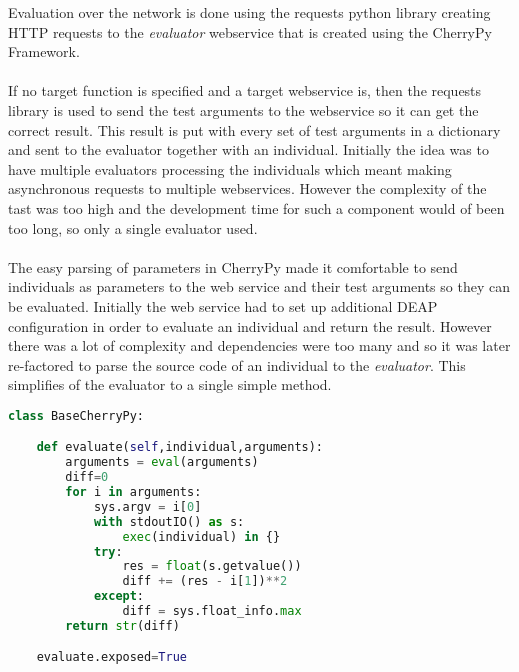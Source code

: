 Evaluation over the network is done using the requests python library creating HTTP requests to the \textit{evaluator} webservice that is created using the CherryPy Framework.
\paragraph{}
If no target function is specified and a target webservice is, then the requests library is used to send the test arguments to the webservice so it can get the correct result. This result
is put with every set of test arguments in a dictionary and sent to the evaluator together with an individual. Initially the idea was to have multiple evaluators processing the
individuals which meant making asynchronous requests to multiple webservices. However the complexity of the tast was too high and the development time for such a component would
of been too long, so only a single evaluator used.
\paragraph{}
The easy parsing of parameters in CherryPy made it comfortable to send individuals as parameters to the web service and their test arguments so they can be evaluated. Initially
the web service had to set up additional DEAP configuration in order to evaluate an individual and return the result. However there was a lot of complexity and dependencies were
too many and so it was later re-factored to parse the source code of an individual to the \textit{evaluator}. This simplifies of the evaluator to 
a single simple method.

\begin{lstlisting}[language=Python,caption={The soruce of the evaluator},label={lst:evaluator}]
class BaseCherryPy:

    def evaluate(self,individual,arguments):
        arguments = eval(arguments)
        diff=0
        for i in arguments:
            sys.argv = i[0]
            with stdoutIO() as s:
                exec(individual) in {}
            try:
                res = float(s.getvalue())
                diff += (res - i[1])**2
            except:
                diff = sys.float_info.max
        return str(diff)

    evaluate.exposed=True
\end{lstlisting}

